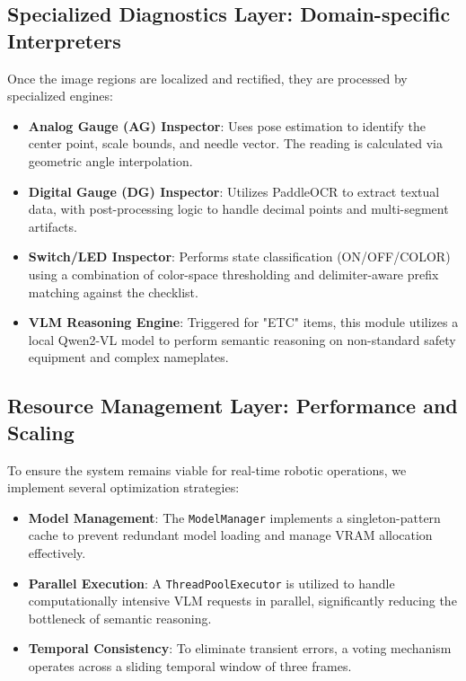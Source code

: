 \subsection{Specialized Diagnostics Layer: Domain-specific Interpreters}
Once the image regions are localized and rectified, they are processed by specialized engines:
\begin{itemize}
    \item \textbf{Analog Gauge (AG) Inspector}: Uses pose estimation to identify the center point, scale bounds, and needle vector. The reading is calculated via geometric angle interpolation.
    \item \textbf{Digital Gauge (DG) Inspector}: Utilizes PaddleOCR to extract textual data, with post-processing logic to handle decimal points and multi-segment artifacts.
    \item \textbf{Switch/LED Inspector}: Performs state classification (ON/OFF/COLOR) using a combination of color-space thresholding and delimiter-aware prefix matching against the checklist.
    \item \textbf{VLM Reasoning Engine}: Triggered for "ETC" items, this module utilizes a local Qwen2-VL model to perform semantic reasoning on non-standard safety equipment and complex nameplates.
\end{itemize}

\subsection{Resource Management Layer: Performance and Scaling}
To ensure the system remains viable for real-time robotic operations, we implement several optimization strategies:
\begin{itemize}
    \item \textbf{Model Management}: The \texttt{ModelManager} implements a singleton-pattern cache to prevent redundant model loading and manage VRAM allocation effectively.
    \item \textbf{Parallel Execution}: A \texttt{ThreadPoolExecutor} is utilized to handle computationally intensive VLM requests in parallel, significantly reducing the bottleneck of semantic reasoning.
    \item \textbf{Temporal Consistency}: To eliminate transient errors, a voting mechanism operates across a sliding temporal window of three frames.
\end{itemize}

